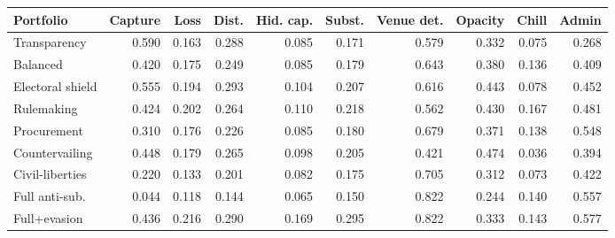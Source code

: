 \begingroup
\begin{center}
\begin{minipage}{\textwidth}
\centering
\scriptsize
\setlength{\tabcolsep}{3pt}
\begin{tabular*}{\textwidth}{@{\extracolsep{\fill}}lrrrrrrrrr@{}}
\toprule
Portfolio & Capture & Loss & Dist. & Hid. cap. & Subst. & Venue det. & Opacity & Chill & Admin \\
\midrule
Transparency & 0.590 & 0.163 & 0.288 & 0.085 & 0.171 & 0.579 & 0.332 & 0.075 & 0.268 \\
Balanced & 0.420 & 0.175 & 0.249 & 0.085 & 0.179 & 0.643 & 0.380 & 0.136 & 0.409 \\
Electoral shield & 0.555 & 0.194 & 0.293 & 0.104 & 0.207 & 0.616 & 0.443 & 0.078 & 0.452 \\
Rulemaking & 0.424 & 0.202 & 0.264 & 0.110 & 0.218 & 0.562 & 0.430 & 0.167 & 0.481 \\
Procurement & 0.310 & 0.176 & 0.226 & 0.085 & 0.180 & 0.679 & 0.371 & 0.138 & 0.548 \\
Countervailing & 0.448 & 0.179 & 0.265 & 0.098 & 0.205 & 0.421 & 0.474 & 0.036 & 0.394 \\
Civil-liberties & 0.220 & 0.133 & 0.201 & 0.082 & 0.175 & 0.705 & 0.312 & 0.073 & 0.422 \\
Full anti-sub. & 0.044 & 0.118 & 0.144 & 0.065 & 0.150 & 0.822 & 0.244 & 0.140 & 0.557 \\
Full+evasion & 0.436 & 0.216 & 0.290 & 0.169 & 0.295 & 0.822 & 0.333 & 0.143 & 0.577 \\
\bottomrule
\end{tabular*}
\par\smallskip
\captionsetup{hypcap=false}
\label{tab:portfolio}
\end{minipage}
\end{center}
\endgroup
